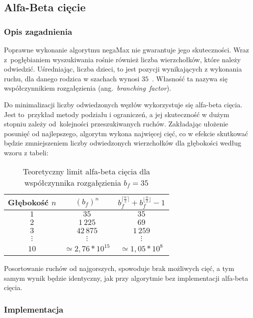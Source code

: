 \subsection{Alfa-Beta cięcie}
\label{subsec:alfa-beta-ciecie}
\subsubsection{Opis zagadnienia}
Poprawne wykonanie algorytmu negaMax nie gwarantuje jego skuteczności.
Wraz z~pogłębianiem wyszukiwania rośnie również liczba wierzchołków, które należy odwiedzić.
Uśredniając, liczba dzieci, to jest pozycji wynikających z wykonania ruchu, dla danego rodzica w szachach wynosi $35$~\cite*{branching-factor}.
Własność ta nazywa się współczynnikiem rozgałęzienia (ang.~\textit{branching~factor}).

Do minimalizacji liczby odwiedzonych węzłów wykorzystuje się alfa-beta cięcia.
Jest to~przykład metody podziału i ograniczeń, a jej skuteczność w dużym stopniu zależy od~kolejności przeszukiwanych ruchów.
Zakładając ułożenie posunięć od najlepszego, algorytm wykona najwięcej cięć, co w efekcie skutkować będzie zmniejszeniem liczby odwiedzonych wierzchołków dla głębokości według wzoru z tabeli:

\begin{table}[htb] \small
\centering
\caption{Teoretyczny limit alfa-beta cięcia dla współczynnika rozgałęzienia $b_f = 35$}
\label{tab:alfa-beat-limit}
\renewcommand{\arraystretch}{1.5}
\begin{tabular}{|c|c|c|}\hline
Głębokość $n$ & $({b_{f}})^{n}$ & $b_{f}^{\lceil \frac{n}{2} \rceil} + b_{f}^{\lfloor \frac{n}{2} \rfloor} - 1$\\ \hline\hline

$1$ & $35$ & $35$\\ \hline
$2$ & $1\,225$ & $69$\\ \hline
$3$ & $42\,875$ & $1\,259$\\ \hline
$\vdots$ & $\vdots$ & $\vdots$\\ \hline
$10$ & $\simeq2,76 * 10^{15}$ & $\simeq1,05 * 10^{8}$\\ \hline

\end{tabular}
\end{table}

Posortowanie ruchów od najgorszych, spowoduje brak możliwych cięć, a tym samym wynik będzie identyczny, jak przy algorytmie bez implementacji alfa-beta cięcia.


\subsubsection{Implementacja}


